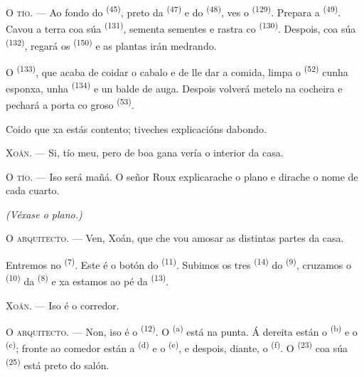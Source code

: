 \textsc{O tío}. --- Ao fondo do  \textsuperscript{(45)}, preto da
 \textsuperscript{(47)} e do 
\textsuperscript{(48)}, ves o  \textsuperscript{(129)}. Prepara a
 \textsuperscript{(49)}. Cavou a terra coa súa 
\textsuperscript{(131)}, sementa sementes e rastra co  \textsuperscript{(130)}.
Despois, coa súa  \textsuperscript{(132)}, regará os 
\textsuperscript{(150)} e as plantas irán medrando.

O  \textsuperscript{(133)}, que acaba de coidar o cabalo e de lle dar a
comida, limpa o  \textsuperscript{(52)} cunha esponxa, unha
 \textsuperscript{(134)} e un balde de auga. Despois volverá
metelo na cocheira e pechará a porta co groso  \textsuperscript{(53)}.

Coido que xa estás contento; tiveches explicacións dabondo.

\textsc{Xoán}. --- Si, tío meu, pero de boa gana vería o interior da casa.

\textsc{O tío}. --- Iso será mañá. O señor Roux explicarache o plano e dirache o nome de cada
cuarto.

\VUsaut{3.0mm}
\VUsaut{2.4mm}

{\centering\textit{(Véxase o plano.)}\par}
\VUsaut{2.4mm}

\textsc{O arquitecto}. --- Ven, Xoán, que che vou amosar as distintas partes da casa.

Entremos no  \textsuperscript{(7)}. Este é o botón do
 \textsuperscript{(11)}. Subimos os tres 
\textsuperscript{(14)} do  \textsuperscript{(9)}, cruzamos o
 \textsuperscript{(10)} da 
\textsuperscript{(8)} e xa estamos ao pé da  \textsuperscript{(13)}.

\textsc{Xoán}. --- Iso é o corredor.

\textsc{O arquitecto}. --- Non, iso é o  \textsuperscript{(12)}. O
 \textsuperscript{(a)} está na punta. Á dereita están o
 \textsuperscript{(b)} e o  \textsuperscript{(c)};
fronte ao comedor están a  \textsuperscript{(d)} e o 
\textsuperscript{(e)}, e despois, diante, o  \textsuperscript{(f)}. O
 \textsuperscript{(23)} coa súa
 \textsuperscript{(25)} está preto do salón.

